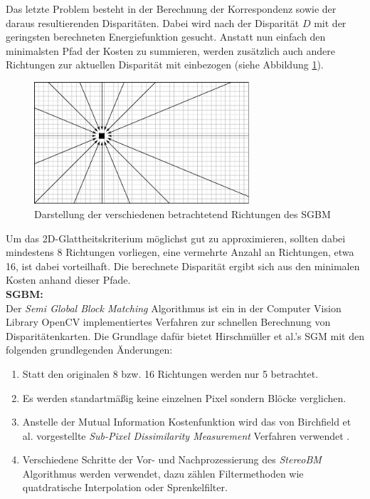 \noindent
Das letzte Problem besteht in der Berechnung der Korrespondenz sowie der daraus resultierenden Disparitäten. Dabei wird nach der Disparität $D$ mit der geringsten berechneten Energiefunktion gesucht. Anstatt nun einfach den minimalsten Pfad der Kosten zu summieren, werden zusätzlich auch andere Richtungen zur aktuellen Disparität mit einbezogen (siehe Abbildung \ref{fig:sgm_directions}).

\begin{figure}[h]
	\centering
	\includegraphics[width=8cm]{img/sgm_directions.pdf}
	\caption{Darstellung der verschiedenen betrachtetend Richtungen des SGBM}
	\label{fig:sgm_directions}
\end{figure}

\noindent
Um das 2D-Glattheitskriterium möglichst gut zu approximieren,  sollten dabei mindestens 8 Richtungen vorliegen, eine vermehrte Anzahl an Richtungen, etwa 16, ist dabei vorteilhaft. Die berechnete Disparität ergibt sich aus den minimalen Kosten anhand dieser Pfade.\\

\noindent
\textbf{SGBM:} \\
Der \emph{Semi Global Block Matching} Algorithmus ist ein in der Computer Vision Library OpenCV implementiertes Verfahren zur schnellen Berechnung von Disparitätenkarten. Die Grundlage dafür bietet Hirschmüller et al.’s SGM \cite{hirschmueller2008sgm} mit den folgenden grundlegenden Änderungen:

\begin{enumerate}[label=C.\arabic*]
	\item Statt den originalen 8 bzw. 16 Richtungen werden nur 5 betrachtet. \label{item:differences_directions}
	\item Es werden  standartmäßig keine einzelnen Pixel sondern Blöcke verglichen. \label{item:differences_matching}
	\item Anstelle der Mutual Information Kostenfunktion wird das von Birchfield et al. vorgestellte \emph{Sub-Pixel Dissimilarity Measurement} Verfahren verwendet \cite{birchfield-tomasi}.
	\item Verschiedene Schritte der Vor- und Nachprozessierung des \emph{StereoBM} Algorithmus werden verwendet, dazu zählen Filtermethoden wie quatdratische Interpolation oder Sprenkelfilter.
\end{enumerate}

